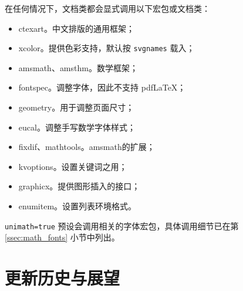 \documentclass{SYSUDaily}
\begin{document}
在任何情况下，文档类都会显式调用以下宏包或文档类：
\begin{itemize}[parsep=0pt,itemsep=0pt]
	\item
	      \textsf{ctexart}。中文排版的通用框架；
	\item
	      \textsf{xcolor}。提供色彩支持，默认按 \verb|svgnames| 载入；
	\item
	      \textsf{amsmath}、\textsf{amsthm}。数学框架；
	\item
	      \textsf{fontspec}。调整字体，因此不支持 pdf\LaTeX{}；
	\item
	      \textsf{geometry}。用于调整页面尺寸；
	\item
	      \textsf{eucal}。调整手写数学字体样式；
	\item
	      \textsf{fixdif}、\textsf{mathtools}。\textsf{amsmath}的扩展；
	\item
	      \textsf{kvoptions}。设置关键词之用；
	\item
	      \textsf{graphicx}。提供图形插入的接口；
	\item
	      \textsf{enumitem}。设置列表环境格式。
\end{itemize}
\verb|unimath=true| 预设会调用相关的字体宏包，具体调用细节已在第 \ref{ssec:math_fonts} 小节中列出。

\section{更新历史与展望}
\end{document}
